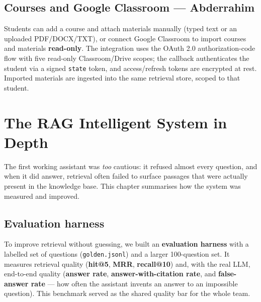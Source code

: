 \documentclass[11pt,a4paper]{article}
\begin{document}
\subsection{Courses and Google Classroom --- Abderrahim}
Students can add a course and attach materials manually (typed text or an uploaded PDF/DOCX/TXT), or connect Google Classroom to import courses and materials \textbf{read-only}. The integration uses the OAuth 2.0 authorization-code flow with five read-only Classroom/Drive scopes; the callback authenticates the student via a signed \texttt{state} token, and access/refresh tokens are encrypted at rest. Imported materials are ingested into the same retrieval store, scoped to that student.

\section{The RAG Intelligent System in Depth}
The first working assistant was \textit{too} cautious: it refused almost every question, and when it did answer, retrieval often failed to surface passages that were actually present in the knowledge base. This chapter summarises how the system was measured and improved.

\subsection{Evaluation harness}
To improve retrieval without guessing, we built an \textbf{evaluation harness} with a labelled set of questions (\texttt{golden.jsonl}) and a larger 100-question set. It measures retrieval quality (\textbf{hit@5}, \textbf{MRR}, \textbf{recall@10}) and, with the real LLM, end-to-end quality (\textbf{answer rate}, \textbf{answer-with-citation rate}, and \textbf{false-answer rate} --- how often the assistant invents an answer to an impossible question). This benchmark served as the shared quality bar for the whole team.
\end{document}
